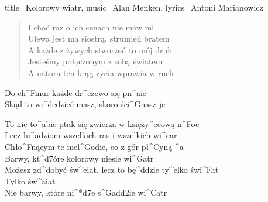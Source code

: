 \begin{song}{title={Kolorowy wiatr}, music={Alan Menken}, lyrics={Antoni Marianowicz}}
\begin{multicols}{2}
\begin{verse}
		I choć raz o ich cenach nie mów mi \\
		Ulewa jest mą siostrą, strumień bratem \\
		A każde z żywych stworzeń to mój druh \\
		Jesteśmy połączonym z sobą światem \\
		A natura ten krąg życia wprawia w ruch 
	\end{verse}
	\begin{interlude}
		Do ch^{F}mur każde dr^{e}zewo się pn^{a}ie \\
		Skąd to wi^{d}edzieć masz, skoro ści^{G}nasz je
	\end{interlude}
	\begin{chorus}
		To nie to^{a}bie ptak się zwierza w księży^{e}cową n^{F}oc  \\
		Lecz lu^{a}dziom wszelkich ras i wszelkich wi^{e}ar \\ 		Chło^{F}nącym te mel^{G}odie, co z gór pł^{C}yną ^{a} \\
		Barwy, kt^{d7}óre kolorowy niesie wi^{G}atr \\
		Możesz zd^{d}obyć św^{e}iat, lecz to bę^{d}dzie ty^{e}lko świ^{F}at \\
		Tylko św^{a}iat \\
		Nie barwy, które ni^*{d7}e s^{Gadd2}ie wi^{C}atr \\
	\end{chorus}
\end{multicols}
\end{song}

